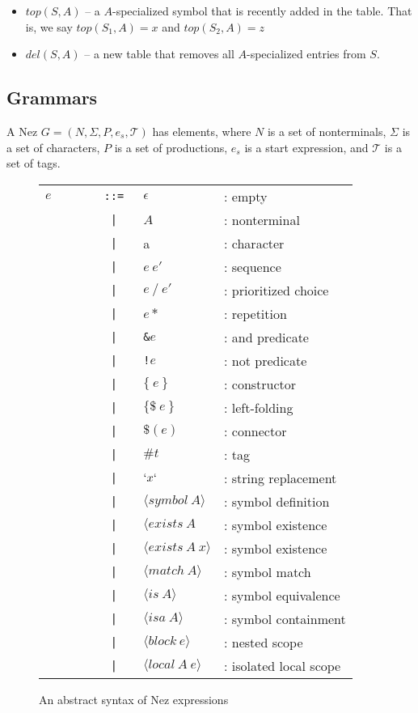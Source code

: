 \documentclass[preprint]{sigplanconf}
\begin{document}
\begin{itemize}
\item $top(S, A)$ -- a $A$-specialized symbol that is recently added in the table. That is, we say $top(S_1, A) = x$ and $top(S_2, A) = z$
\item $del(S, A)$ -- a new table that removes all $A$-specialized entries from $S$. 
\end{itemize}

\subsection{Grammars}



A Nez $G = (N, \Sigma, P, e_s, \mathcal{T})$ has elements, where $N$ is a set of nonterminals, 
$\Sigma$ is a set of characters, $P$ is a set of productions, $e_s$ is a start expression, and $\mathcal{T}$ is a set of tags.

\begin{figure}[tb]
\begin{center}
\begin{tabular}{lrll} $e$ &  \verb|      ::= | & $\epsilon$ & : empty \\ 
& \verb#|  # & $A$ & : nonterminal  \\
& \verb#|  # & a & : character \\
& \verb#|  # & $e ~ e' $ & : sequence \\
& \verb#|  # & $e ~ / ~ e' $ & : prioritized choice \\
& \verb#|  # & $e*$ &  : repetition  \\
& \verb#|  # & \verb|&|$e$ &  : and predicate  \\
& \verb#|  # & \verb|!|$e$ &  : not predicate  \\
& \verb#|  # & $\{~e~\}$ &  : constructor  \\
& \verb#|  # & $\{\$~e~\}$ &  : left-folding  \\
& \verb#|  # & $\$(e)$ &  : connector  \\
& \verb#|  # & $\#t$ &  : tag  \\
& \verb#|  # & $`x`$ &  : string replacement  \\
& \verb#|  # & $\langle symbol~A\rangle$ & : symbol definition \\
& \verb#|  # & $\langle exists~A$ & : symbol existence  \\
& \verb#|  # & $\langle exists~A~x\rangle$ & : symbol existence  \\
& \verb#|  # & $\langle match~A\rangle$ & : symbol match \\
& \verb#|  # & $\langle is~A\rangle$ & : symbol equivalence \\
& \verb#|  # & $\langle isa~A\rangle$ & : symbol containment  \\
& \verb#|  # & $\langle block~e\rangle$ & : nested scope \\
& \verb#|  # & $\langle local~A~e\rangle$ & : isolated local scope  \\
\end{tabular}
\end{center}
\caption{An abstract syntax of Nez expressions}
\label{fig:syntax}
\end{figure}
\end{document}
